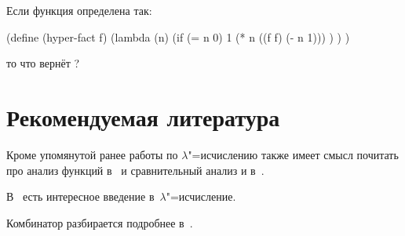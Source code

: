 \begin{exercise}\label{lisp1-2-omega/ex:hyper-fact}
Если функция  определена так:

\begin{code:lisp}
(define (hyper-fact f)
  (lambda (n)
    (if (= n 0) 1
        (* n ((f f) (- n 1))) ) ) )
\end{code:lisp}

\noindent
то что вернёт ?
\end{exercise}

\section*{Рекомендуемая литература}%
\label{lisp1-2-omega/sect:recommended-reading}

Кроме упомянутой ранее работы по $\lambda$"=исчислению \cite{ss78a} также имеет
смысл почитать про анализ функций в~\cite{mos70} и сравнительный анализ 
и  в~\cite{gp88}.

В~\cite{gor88} есть интересное введение в~$\lambda$"=исчисление.

Комбинатор  разбирается подробнее в~\cite{gab88}.
